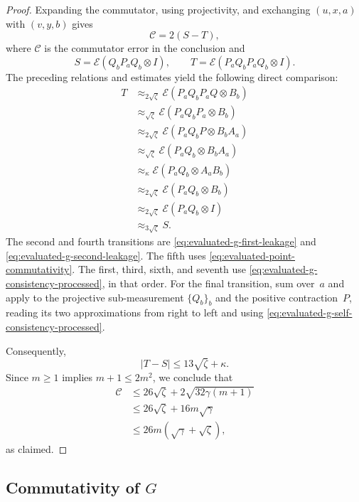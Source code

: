 \documentclass[11pt]{article}
\theoremstyle{definition}
\begin{document}
\begin{proof}
Expanding the commutator, using projectivity, and exchanging
$(u,x,a)$ with $(v,y,b)$ gives
\[
 \mathcal C=2(S-T),
\]
where $\mathcal C$ is the commutator error in the conclusion and
\[
 S=\mathcal E(Q_bP_aQ_b\otimes I),
 \qquad
 T=\mathcal E(P_aQ_bP_aQ_b\otimes I).
\]
The preceding relations and estimates yield the following direct
comparison:
\begin{align*}
T
&\approx_{2\sqrt\zeta}
 \mathcal E(P_aQ_bP_aQ\otimes B_b)\\
&\approx_{\sqrt\zeta}
 \mathcal E(P_aQ_bP_a\otimes B_b)\\
&\approx_{2\sqrt\zeta}
 \mathcal E(P_aQ_bP\otimes B_bA_a)\\
&\approx_{\sqrt\zeta}
 \mathcal E(P_aQ_b\otimes B_bA_a)\\
&\approx_\kappa
 \mathcal E(P_aQ_b\otimes A_aB_b)\\
&\approx_{2\sqrt\zeta}
 \mathcal E(P_aQ_b\otimes B_b)\\
&\approx_{2\sqrt\zeta}
 \mathcal E(P_aQ_b\otimes I)\\
&\approx_{3\sqrt\zeta}S.
\end{align*}
The second and fourth transitions are
\eqref{eq:evaluated-g-first-leakage} and
\eqref{eq:evaluated-g-second-leakage}.  The fifth uses
\eqref{eq:evaluated-point-commutativity}.  The first, third, sixth,
and seventh use \eqref{eq:evaluated-g-consistency-processed}, in that order.
For the final transition, sum over~$a$ and apply
 to the projective sub-measurement
$\{Q_b\}_b$ and the positive contraction~$P$, reading its two
approximations from right to left and using
\eqref{eq:evaluated-g-self-consistency-processed}.

Consequently,
\[
 |T-S|\leq13\sqrt\zeta+\kappa.
\]
Since $m\geq1$ implies $m+1\leq2m^2$, we conclude that
\begin{align*}
 \mathcal C
 &\leq26\sqrt\zeta+2\sqrt{32\gamma(m+1)}\\
 &\leq26\sqrt\zeta+16m\sqrt\gamma\\
 &\leq26m(\sqrt\gamma+\sqrt\zeta),
\end{align*}
as claimed.
\end{proof}

\subsection{\texorpdfstring{Commutativity of $G$}{Commutativity of the slice measurements}}\label{sec:G-commutes}
\end{document}

